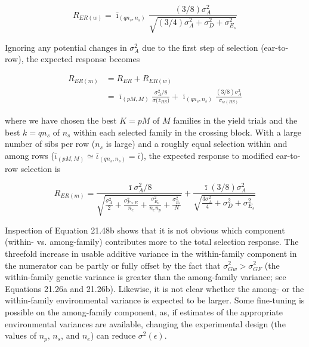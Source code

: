 \documentclass{article}
\begin{document}
\begin{equation}
R_{ER(w)}=\bar{\imath}_{(qn_{s},n_{s})}\frac{(3/8)\sigma_{A}^{2}}{\sqrt{(3/4)\sigma_{A}^{2}+\sigma_{D}^{2}+\sigma_{E_{s}}^{2}}}
\tag{21.47}
\label{eq:21_47}
\end{equation}

Ignoring any potential changes in  $ \sigma_{A}^{2} $ due to the first step of selection (ear-to-row), the expected response becomes

\begin{equation}
\begin{aligned}R_{ER(m)}&=R_{ER}+R_{ER(w)}\\&=\overline{\imath}_{(pM,M)}\frac{\sigma_{A}^{2}/8}{\sigma\big(\overline{z}_{HS}\big)}+\overline{\imath}_{(qn_{s},n_{s})}\frac{(3/8)\sigma_{A}^{2}}{\sigma_{w(HS)}}\end{aligned}
\tag{21.48a}
\label{eq:21_48a}
\end{equation}

where we have chosen the best $K = pM$ of $M$ families in the yield trials and the best $k = qn_s$ of $n_s$ within each selected family in the crossing block. With a large number of sibs per row ($n_s$ is large) and a roughly equal selection within and among rows ($\bar{\iota}_{(pM,M)} \simeq \bar{\iota}_{(qn_s,n_s)} = \bar{\iota}$), the expected response to modified ear-to-row selection is

\begin{equation}
R_{E R(m)}=\frac{\bar{\imath}\sigma_{A}^{2}/8}{\sqrt{\frac{\sigma_{A}^{2}}{2}+\frac{\sigma_{F\times E}^{2}}{n_{e}}+\frac{\sigma_{E_{p}}^{2}}{n_{e}n_{p}}+\frac{\sigma_{E_{s}}^{2}}{N}}}+\frac{\bar{\imath}(3/8)\sigma_{A}^{2}}{\sqrt{\frac{3\sigma_{A}^{2}}{4}+\sigma_{D}^{2}+\sigma_{E_{s}}^{2}}}
\tag{21.48b}
\label{eq:21_48b}
\end{equation}

Inspection of Equation 21.48b shows that it is not obvious which component (within- vs. among-family) contributes more to the total selection response. The threefold increase in usable additive variance in the within-family component in the numerator can be partly or fully offset by the fact that  $ \sigma_{Gw}^2 > \sigma_{GF}^2 $ (the within-family genetic variance is greater than the among-family variance; see Equations 21.26a and 21.26b). Likewise, it is not clear whether the among- or the within-family environmental variance is expected to be larger. Some fine-tuning is possible on the among-family component, as, if estimates of the appropriate environmental variances are available, changing the experimental design (the values of  $ n_p $,  $ n_s $, and  $ n_e $) can reduce  $ \sigma^2(\epsilon) $.
\end{document}

